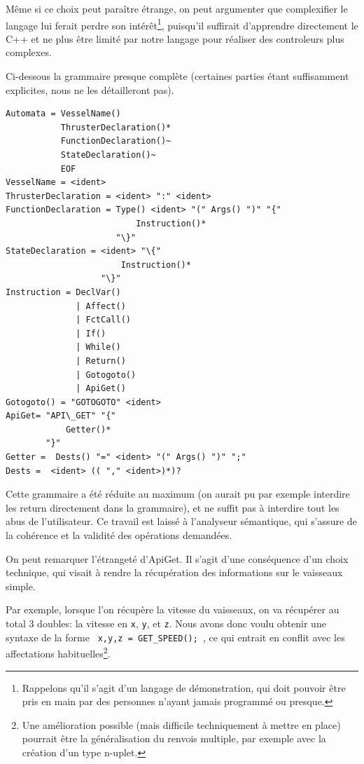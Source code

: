 \documentclass[a4paper,11pt]{article}
\begin{document}
        Même si ce choix peut paraître étrange, on peut argumenter que complexifier le langage lui ferait perdre son intérêt\footnote{Rappelons qu'il s'agit d'un langage de démonstration, qui doit pouvoir être pris en main par des personnes n'ayant jamais programmé ou presque.}, puisqu'il suffirait d'apprendre directement le C++ et ne plus être limité par notre langage pour réaliser des controleurs plus complexes.
        
        Ci-dessous la grammaire presque complète (certaines parties étant suffisamment explicites, nous ne les détailleront pas).

        \begin{Verbatim}[frame=single]
Automata = VesselName()
           ThrusterDeclaration()*
           FunctionDeclaration()~
           StateDeclaration()~
           EOF
VesselName = <ident>
ThrusterDeclaration = <ident> ":" <ident>
FunctionDeclaration = Type() <ident> "(" Args() ")" "{"
                          Instruction()*  
                      "\}"  
StateDeclaration = <ident> "\{"
                       Instruction()* 
                   "\}" 
Instruction = DeclVar()
              | Affect()
              | FctCall()
              | If() 
              | While() 
              | Return()
              | Gotogoto() 
              | ApiGet() 
Gotogoto() = "GOTOGOTO" <ident>
ApiGet= "API\_GET" "{" 
            Getter()*
        "}"
Getter =  Dests() "=" <ident> "(" Args() ")" ";"
Dests =  <ident> (( "," <ident>)*)?
        \end{Verbatim}

        Cette grammaire a été réduite au maximum (on aurait pu par exemple interdire les return directement dans la grammaire), et ne suffit pas à interdire tout les abus de l'utilisateur. Ce travail est laissé à l'analyseur sémantique, qui s'assure de la cohérence et la validité des opérations demandées.
        
        On peut remarquer l'étrangeté d'ApiGet. Il s'agit d'une conséquence d'un choix technique, qui visait à rendre la récupération des informations sur le vaisseaux simple. 
        
        Par exemple, lorsque l'on récupère la vitesse du vaisseaux, on va récupérer au total 3 doubles: la vitesse en \verb|x|, \verb|y|, et \verb|z|. Nous avons donc voulu obtenir une syntaxe de la forme \verb| x,y,z = GET_SPEED(); |, ce qui entrait en conflit avec les affectations habituelles\footnote{Une amélioration possible (mais difficile techniquement à mettre en place) pourrait être la généralisation du renvois multiple, par exemple avec la création d'un type n-uplet.}.
        
\end{document}
